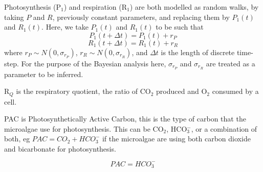 \documentclass{ruthesis}
\begin{document}
Photosynthesis (P$_1$) and respiration (R$_1$) are both modelled as random walks, by taking \begin{math}P\end{math} and \begin{math}R\end{math}, previously constant parameters, and replacing them by \begin{math}P_1(t)\end{math} and \begin{math}R_1(t)\end{math}. Here, we take \begin{math}P_1(t)\end{math} and \begin{math}R_1(t)\end{math} to be such that
\begin{displaymath}
P_1(t+\Delta t) = P_1(t) + r_P
\end{displaymath}
\begin{displaymath}
R_1(t+\Delta t) = R_1(t) + r_R
\end{displaymath}
where \begin{math}
r_P \sim N(0, \sigma_{r_P})
\end{math}, \begin{math}
r_R \sim N(0, \sigma_{r_R})
\end{math}, and \begin{math}
\Delta t
\end{math} is the length of discrete time-step. For the purpose of the Bayesian analysis here, \begin{math}\sigma_{r_P}\end{math} and \begin{math}\sigma_{r_R}\end{math} are treated as a parameter to be inferred. 


R$_Q$ is the respiratory quotient, the ratio of CO$_2$ produced and O$_2$ consumed by a cell. 





PAC is Photosynthetically Active Carbon, this is the type of carbon that the microalgae use for photosynthesis. This can be CO$_2$, HCO$_3^-$, or a combination of both, eg $PAC = CO_2 + HCO_3^-$ if the microalgae are using both carbon dioxide and bicarbonate for photosynthesis.  

\begin{equation}
PAC = HCO_3^-
\end{equation}
\end{document}
